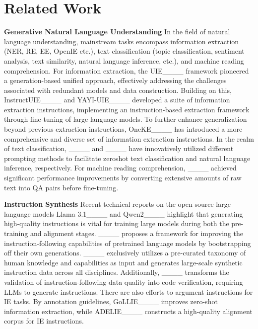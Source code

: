\section{Related Work}
\noindent \textbf{Generative Natural Language Understanding}
In the field of natural language understanding, mainstream tasks encompass information extraction (NER, RE, EE, OpenIE etc.), text classification (topic classification, sentiment analysis, text similarity, natural language inference, etc.), and machine reading comprehension.
For information extraction, the UIE____ framework pioneered a generation-based unified approach, effectively addressing the challenges associated with redundant models and data construction. Building on this, InstructUIE____ and YAYI-UIE____ developed a suite of information extraction instructions, implementing an instruction-based extraction framework through fine-tuning of large language models. To further enhance generalization beyond previous extraction instructions, OneKE____ has introduced a more comprehensive and diverse set of information extraction instructions.
In the realm of text classification, ____ and ____ have innovatively utilized different prompting methods to facilitate zeroshot text classification and natural language inference, respectively. For machine reading comprehension, ____ achieved significant performance improvements by converting extensive amounts of raw text into QA pairs before fine-tuning.

\noindent \textbf{Instruction Synthesis} 
Recent technical reports on the open-source large language models Llama 3.1____ and Qwen2____ highlight that generating high-quality instructions is vital for training large models during both the pre-training and alignment stages. ____ proposes a framework for improving the instruction-following capabilities of pretrained language models by bootstrapping off their own generations. ____ exclusively utilizes a pre-curated taxonomy of human knowledge and capabilities as input and generates large-scale synthetic instruction data across all disciplines. Additionally, ____ transforms the validation of instruction-following data quality into code verification, requiring LLMs to generate instructions. There are also efforts to argument instructions for IE tasks. By annotation guidelines, GoLLIE____ improves zero-shot information extraction, while ADELIE____ constructs a high-quality alignment corpus for IE instructions.
